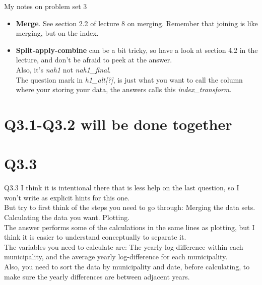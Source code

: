 \documentclass[10pt,danish,t,10pt]{beamer}
\newcommand{\code}[1]{\textit{#1}} %
\begin{document}
\begin{frame}{My notes on problem set 3}

\begin{itemize}
    \item[Q 2.2] \textbf{Merge}. See section 2.2 of lecture 8 on merging. Remember that joining is like merging, but on the index.
    \item[Q 2.3] \textbf{Split-apply-combine} can be a bit tricky, so have a look at section 4.2 in the lecture, and don't be afraid to peek at the answer. \\
    Also, it's \code{nah1} not \code{nah1\_final}. \\
    The question mark in \code{h1\_alt[?]}, is just what you want to call the column where your storing your data, the answers calls this \code{index\_transform}.
\end{itemize}
\end{frame}
\section{Q3.1-Q3.2 will be done together}
\section{Q3.3}
\begin{frame}{Q3.3}
    I think it is intentional there that is less help on the last question, so I won't write as explicit hints for this one. \\
    But try to first think of the steps you need to go through: Merging the data sets. Calculating the data you want. Plotting. \\
    The answer performs some of the calculations in the same lines as plotting, but I think it is easier to understand conceptually to separate it. \\
    The variables you need to calculate are: The yearly log-difference within each municipality, and the average yearly log-difference for each municipality. \\
    Also, you need to sort the data by municipality and date, before calculating, to make sure the yearly differences are between adjacent years.
\end{frame}
\end{document}
